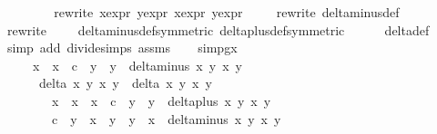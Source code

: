 \begin{isabellebody}
\ \ {\isachardoublequoteclose}\isanewline
\ \ \ \ \isamarkupfalse%
{\isacharparenleft}rewrite\ x{}{\isacharprime}{\isacharunderscore}expr\ y{}{\isacharprime}{\isacharunderscore}expr\ x{}{\isacharprime}{\isacharunderscore}expr\ y{}{\isacharprime}{\isacharunderscore}expr{\isacharparenright}{\isacharplus}\isanewline
\ \ \ \ \isamarkupfalse%
{\isacharparenleft}rewrite\ delta{\isacharunderscore}minus{\isacharunderscore}def{\isacharparenright}\isanewline
\ \ \ \ \isamarkupfalse%
{\isacharparenleft}rewrite\ \ {\isachardoublequoteopen}{\isacharunderscore}\ {\isacharslash}\ {\isasymhole}{\isachardoublequoteclose}\ delta{\isacharunderscore}minus{\isacharunderscore}def{\isacharbrackleft}symmetric{\isacharbrackright}\ delta{\isacharunderscore}plus{\isacharunderscore}def{\isacharbrackleft}symmetric{\isacharbrackright}{\isacharparenright}{\isacharplus}\isanewline
\ \ \ \ \isamarkupfalse%
\ delta{\isacharunderscore}def\isanewline
\ \ \ \ \isamarkupfalse%
{\isacharparenleft}simp\ add{\isacharcolon}\ divide{\isacharunderscore}simps\ assms{\isacharparenleft}{}{\isacharminus}{}{\isacharparenright}{\isacharparenright}\isanewline
\isanewline
\ \ \isamarkupfalse%
\ simp{}gx{\isacharcolon}\isanewline
\ \ \ \ {\isachardoublequoteopen}{\isacharparenleft}x{}\ {\isacharasterisk}\ x{}{\isacharprime}\ {\isacharminus}\ c\ {\isacharasterisk}\ y{}\ {\isacharasterisk}\ y{}{\isacharprime}{\isacharparenright}\ {\isacharasterisk}\ delta{\isacharunderscore}minus\ x{}{\isacharprime}\ y{}{\isacharprime}\ x{}\ y{}\ {\isacharasterisk}\ \isanewline
\ \ \ \ \ {\isacharparenleft}delta\ x{}\ y{}\ x{}\ y{}\ {\isacharasterisk}\ delta\ x{}\ y{}\ x{}\ y{}{\isacharparenright}\ {\isacharequal}\ \isanewline
\ \ \ \ \ \ \ {\isacharparenleft}x{}\ {\isacharasterisk}\ {\isacharparenleft}x{}\ {\isacharasterisk}\ x{}\ {\isacharminus}\ c\ {\isacharasterisk}\ y{}\ {\isacharasterisk}\ y{}{\isacharparenright}\ {\isacharasterisk}\ delta{\isacharunderscore}plus\ x{}\ y{}\ x{}\ y{}\ {\isacharminus}\ \isanewline
\ \ \ \ \ \ \ c\ {\isacharasterisk}\ y{}\ {\isacharasterisk}\ {\isacharparenleft}x{}\ {\isacharasterisk}\ y{}\ {\isacharplus}\ y{}\ {\isacharasterisk}\ x{}{\isacharparenright}\ {\isacharasterisk}\ delta{\isacharunderscore}minus\ x{}\ y{}\ x{}\ y{}{\isacharparenright}\ {\isacharasterisk}\isanewline

\end{isabellebody}
